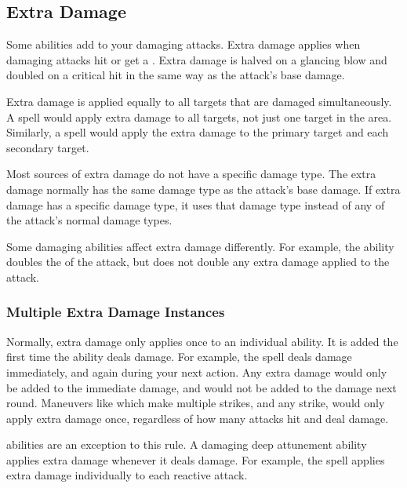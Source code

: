         \subsection{Extra Damage}\label{Extra Damage}
            Some abilities add  to your damaging attacks.
            Extra damage applies when damaging attacks hit or get a .
            Extra damage is halved on a glancing blow and doubled on a critical hit in the same way as the attack's base damage.

            Extra damage is applied equally to all targets that are damaged simultaneously.
            A  spell would apply extra damage to all targets, not just one target in the area.
            Similarly, a  spell would apply the extra damage to the primary target and each secondary target.

            Most sources of extra damage do not have a specific damage type.
            The extra damage normally has the same damage type as the attack's base damage.
            If extra damage has a specific damage type, it uses that damage type instead of any of the attack's normal damage types.

            Some damaging abilities affect extra damage differently.
            For example, the  ability doubles the  of the attack, but does not double any extra damage applied to the attack.

            \subsubsection{Multiple Extra Damage Instances}
                Normally, extra damage only applies once to an individual ability.
                It is added the first time the ability deals damage.
                For example, the  spell deals damage immediately, and again during your next action.
                Any extra damage would only be added to the immediate damage, and would not be added to the damage next round.
                Maneuvers like  which make multiple strikes, and any  strike, would only apply extra damage once, regardless of how many attacks hit and deal damage.

                 abilities are an exception to this rule.
                A damaging deep attunement ability applies extra damage whenever it deals damage.
                For example, the  spell applies extra damage individually to each reactive attack.


